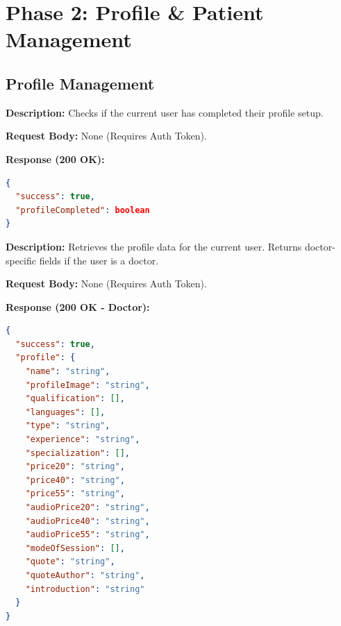 \documentclass{article}
\begin{document}
\section{Phase 2: Profile \& Patient Management}

\subsection{Profile Management}

\begin{tcolorbox}[title=\textcolor{accent}{GET} /api/profile/status]
\textbf{Description:} Checks if the current user has completed their profile setup.

\vspace{0.5em}
\textbf{Request Body:} None (Requires Auth Token).

\vspace{0.5em}
\textbf{Response (200 OK):}
\begin{lstlisting}[language=json]
{
  "success": true,
  "profileCompleted": boolean
}
\end{lstlisting}
\end{tcolorbox}

\begin{tcolorbox}[title=\textcolor{accent}{GET} /api/profile/setup]
\textbf{Description:} Retrieves the profile data for the current user. Returns doctor-specific fields if the user is a doctor.

\vspace{0.5em}
\textbf{Request Body:} None (Requires Auth Token).

\vspace{0.5em}
\textbf{Response (200 OK - Doctor):}
\begin{lstlisting}[language=json]
{
  "success": true,
  "profile": {
    "name": "string",
    "profileImage": "string",
    "qualification": [],
    "languages": [],
    "type": "string",
    "experience": "string",
    "specialization": [],
    "price20": "string",
    "price40": "string",
    "price55": "string",
    "audioPrice20": "string",
    "audioPrice40": "string",
    "audioPrice55": "string",
    "modeOfSession": [],
    "quote": "string",
    "quoteAuthor": "string",
    "introduction": "string"
  }
}
\end{lstlisting}
\end{tcolorbox}
\end{document}
